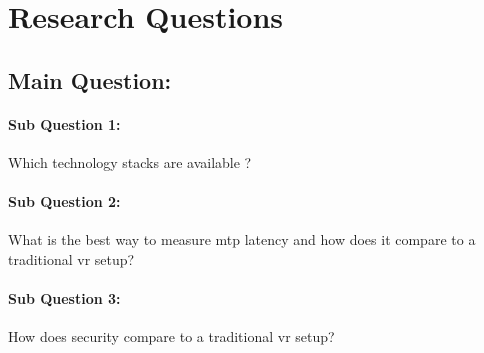 \section{Research Questions}

\subsection*{Main Question:} 
\paragraph{Sub Question 1:} Which technology stacks are available ?
\paragraph{Sub Question 2:} What is the best way to measure \acrshort{mtp} latency and how does it compare to a traditional \acrshort{vr} setup?
\paragraph{Sub Question 3:} How does security compare to a traditional \acrshort{vr} setup?
